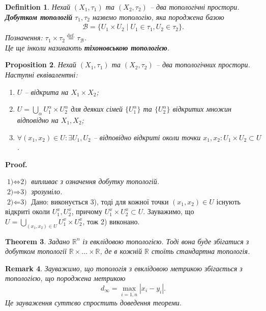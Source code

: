 \documentclass[a4paper, 10pt]{article}
\makeatletter
\theoremstyle{theoremdd}
\newtheorem{theorem}{Theorem}[subsection]
\newtheorem{definition}[theorem]{Definition}
\newtheorem{proposition}[theorem]{Proposition}
\newtheorem{remark}[theorem]{Remark}
\renewenvironment{proof}[1][Proof.\\]{\par
\pushQED{\hfill \qed}%
\normalfont \topsep6\p@\@plus6\p@\relax
\trivlist
\item\relax
{\bfseries
#1\@addpunct{.}}\hspace\labelsep\ignorespaces
}{%
\popQED\endtrivlist\@endpefalse
}
\makeatother
\begin{document}
\begin{definition}
Нехай $(X_1,\tau_1)$ та $(X_2,\tau_2)$ -- два топологічні простори.\\
\textbf{Добутком топологій} $\tau_1,\tau_2$ назвемо топологію, яка породжена базою
\begin{align*}
\mathcal{B} = \{U_1 \times U_2 \mid U_1 \in \tau_1, U_2 \in \tau_2\}.
\end{align*}
Позначення: $\tau_1 \times \tau_2 \overset{\text{def.}}{=} \tau_{\mathcal{B}}$.\\
Це ще інколи називають \textbf{тіхоновською топологією}.
\end{definition}

\begin{proposition}
Нехай $(X_1,\tau_1)$ та $(X_2,\tau_2)$ -- два топологічних простори. Наступні еквівалентні:
\begin{enumerate}[nosep,wide=0pt,label={\arabic*)}]
\item $U$ -- відкрита на $X_1 \times X_2$;
\item $U = \displaystyle\bigcup_\alpha U_1^\alpha \times U_2^\alpha$ для деяких сімей $\{U_1^\alpha\}$ та $\{U_2^\alpha\}$ відкритих множин відповідно на $X_1,X_2$;
\item $\forall (x_1,x_2) \in U: \exists U_1,U_2$ -- відповідно відкриті околи точки $x_1,x_2: U_1 \times U_2 \subset U$.
\end{enumerate}
\end{proposition}

\begin{proof}
$\boxed{\text{1)} \Leftrightarrow \text{2)}}$ \textit{випливає з означення добутку топологій.}
\bigskip \\
$\boxed{\text{2)} \Rightarrow \text{3)}}$ \textit{зрозуміло.}
\bigskip \\
$\boxed{\text{2)} \Leftarrow \text{3)}}$ Дано: виконується 3), тоді для кожної точки $(x_1,x_2) \in U$ існують відкриті околи $U_1^x,U_2^x$, причому $U_1^x \times U_2^x \subset U$. Зауважимо, що $U = \displaystyle\bigcup_{(x_1,x_2) \in U} U_1^x \times U_2^x$, тож 2) виконано.
\end{proof}

\begin{theorem}
Задано $\mathbb{R}^n$ із евклідовою топологією. Тоді вона буде збігатися з добутком топології $\mathbb{R} \times \dots \times \mathbb{R}$, де в кожній $\mathbb{R}$ стоїть стандартна топологія.
\end{theorem}

\begin{remark}
Зауважимо, що топологія з евклідовою метрикою збігається з топологією, що породжена метрикою \[
d_\infty = \displaystyle\max_{i = \overline{1,n}} |x_i-y_i|.
\]
Це зауваження суттєво спростить доведення теореми.
\end{remark}
\end{document}
